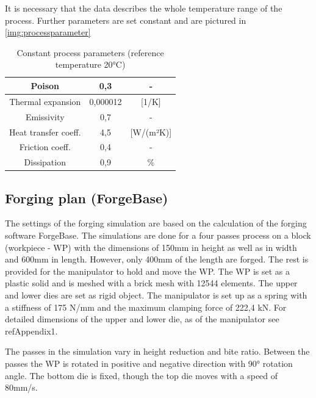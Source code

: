 It is necessary that the data describes the whole temperature range of the process. Further parameters are set constant and are pictured in \ref{img:processparameter}\par 

\begin{table}
 \centering
 \caption{Constant process parameters (reference temperature 20°C)}
 \begin{tabular}{|c|c|c|}
 Poison&0,3&-\\
 \hline
 Thermal expansion&0,000012&[1/K]\\
 \hline
 Emissivity&0,7&-\\
 \hline
 Heat transfer coeff.&4,5&[W/(m²K)]\\
 \hline
 Friction coeff.&0,4&-\\
 \hline
 Dissipation&0,9&\%\\
 \hline
 \end{tabular}
\end{table}\par

\subsection{Forging plan (ForgeBase)}
The settings of the forging simulation are based on the calculation of the forging software ForgeBase. The simulations are done for a four passes process on a block (workpiece - WP) with the dimensions of 150mm in height as well as in width and 600mm in length. However, only 400mm of the length are forged. The rest is provided for the manipulator to hold and move the WP. The WP is set as a plastic solid and is meshed with a brick mesh with 12544 elements. The upper and lower dies are set as rigid object. The manipulator is set up as a spring with a stiffness of 175 N/mm and the maximum clamping force of 222,4 kN. For detailed dimensions of the upper and lower die, as of the manipulator see \\ref{Appendix1}.\par 

The passes in the simulation vary in height reduction and bite ratio. Between the passes the WP is rotated in positive and negative direction with 90° rotation angle. The bottom die is fixed, though the top die moves with a speed of 80mm/s.

